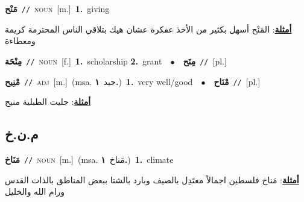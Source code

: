 \documentclass[10pt,a4paper,twoside]{article} %
\begin{document}
\begin{multicols}{2}
{\setlength\topsep{0pt}\textbf{\foreignlanguage{arabic}{مَنْح}}\ {\color{gray}\texttt{//}\color{black}}\ \textsc{noun}\ [m.]\ \textbf{1.}~giving\  \begin{flushright}\color{gray}\foreignlanguage{arabic}{\textbf{\underline{\foreignlanguage{arabic}{أمثلة}}}: المَنْح أسهل بكثير من الأخذ عفكرة عشان هيك بتلاقي الناس المحترمة كريمة ومعطاءة}\end{flushright}\color{black}} \vspace{2mm}

{\setlength\topsep{0pt}\textbf{\foreignlanguage{arabic}{مِنْحَة}}\ {\color{gray}\texttt{//}\color{black}}\ \textsc{noun}\ [f.]\ \textbf{1.}~scholarship  \textbf{2.}~grant\ \ $\bullet$\ \ \setlength\topsep{0pt}\textbf{\foreignlanguage{arabic}{مِنَح}}\ {\color{gray}\texttt{//}\color{black}}\ [pl.]\ } \vspace{2mm}

{\setlength\topsep{0pt}\textbf{\foreignlanguage{arabic}{مْنِيح}}\ {\color{gray}\texttt{//}\color{black}}\ \textsc{adj}\ [m.]\ \color{gray}(msa. \foreignlanguage{arabic}{جيد}~\foreignlanguage{arabic}{\textbf{١.}})\color{black}\ \textbf{1.}~very well/good\ \ $\bullet$\ \ \setlength\topsep{0pt}\textbf{\foreignlanguage{arabic}{مْنَاح}}\ {\color{gray}\texttt{//}\color{black}}\ [pl.]\  \begin{flushright}\color{gray}\foreignlanguage{arabic}{\textbf{\underline{\foreignlanguage{arabic}{أمثلة}}}: جليت الطبلية منيح}\end{flushright}\color{black}} \vspace{2mm}

\vspace{-3mm}
\subsection*{\color{blue}\foreignlanguage{arabic}{م.ن.خ}\color{blue}{}} 

{\setlength\topsep{0pt}\textbf{\foreignlanguage{arabic}{مَنَاخ}}\ {\color{gray}\texttt{//}\color{black}}\ \textsc{noun}\ [m.]\ \color{gray}(msa. \foreignlanguage{arabic}{مَناخ}~\foreignlanguage{arabic}{\textbf{١.}})\color{black}\ \textbf{1.}~climate\  \begin{flushright}\color{gray}\foreignlanguage{arabic}{\textbf{\underline{\foreignlanguage{arabic}{أمثلة}}}: مَناخ فلسطين اجمالاً معتَدِل بالصيف وبارد بالشتا ببعض المناطق بالذات القدس ورام الله والخليل}\end{flushright}\color{black}} \vspace{2mm}


\end{multicols}
\end{document}
